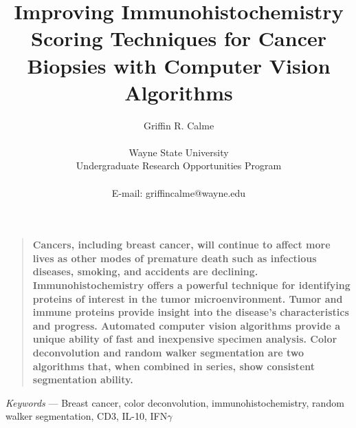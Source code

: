 \documentclass[12pt]{article}
\title{Improving Immunohistochemistry Scoring Techniques for Cancer Biopsies with Computer Vision Algorithms}
\author
{Griffin R. Calme\\
\\
\normalsize{Wayne State University}\\
\normalsize{Undergraduate Research Opportunities Program}\\
\\
\normalsize{E-mail:  griffincalme@wayne.edu}
}
\date{}
\newenvironment{sciabstract}{%
\begin{quote} \bf}
{\end{quote}}
\begin{document}
 


\baselineskip24pt


\maketitle 




\begin{sciabstract}
  Cancers, including breast cancer, will continue to affect more lives as other modes of premature death such as infectious diseases, smoking, and accidents are declining. Immunohistochemistry offers a powerful technique for identifying proteins of interest in the tumor microenvironment. Tumor and immune proteins provide insight into the disease’s characteristics and progress. Automated computer vision algorithms provide a unique ability of fast and inexpensive specimen analysis. Color deconvolution and random walker segmentation are two algorithms that, when combined in series, show consistent segmentation ability.




\end{sciabstract}

\smallskip

\indent \textit{Keywords} --- Breast cancer, color deconvolution, immunohistochemistry, random walker \indent segmentation, CD3, IL-10, IFN$\gamma$

\end{document}
